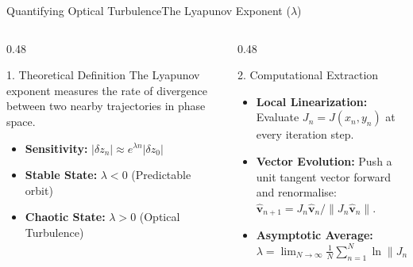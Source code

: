 \documentclass[aspectratio=169]{beamer}
\begin{document}
\begin{frame}[t]{Quantifying Optical Turbulence}{The Lyapunov Exponent ($\lambda$)}
    \vspace{-0.5cm}
    \begin{columns}[T, onlytextwidth]
        
        \begin{column}{0.48\textwidth}
            \begin{customblock}{1. Theoretical Definition}
                The Lyapunov exponent measures the rate of divergence between two nearby trajectories in phase space.
                \begin{itemize}
                    \item \textbf{Sensitivity:} $|\delta z_n| \approx e^{\lambda n} |\delta z_0|$
                    \item \textbf{Stable State:} $\lambda < 0$ (Predictable orbit)
                    \item \textbf{Chaotic State:} $\lambda > 0$ (Optical Turbulence)
                \end{itemize}
            \end{customblock}
        \end{column}
        
        \begin{column}{0.48\textwidth}
            \begin{customblock}{2. Computational Extraction}
                \vspace{-0.1cm} %
                \begin{itemize}
                    \setlength{\itemsep}{0.1cm} %
                    \item \textbf{Local Linearization:} Evaluate $J_n = J(x_n, y_n)$ at every iteration step.
                    \item \textbf{Vector Evolution:} Push a unit tangent vector forward and renormalise: $\hat{\mathbf{v}}_{n+1} = J_n \hat{\mathbf{v}}_n / \|J_n \hat{\mathbf{v}}_n\|$.
                    \item \textbf{Asymptotic Average:} $\lambda = \lim_{N \to \infty} \frac{1}{N} \sum_{n=1}^{N} \ln \|J_n \hat{\mathbf{v}}_n\|$
                \end{itemize}
            \end{customblock}
        \end{column}
    \end{columns}
\end{frame}
\end{document}
